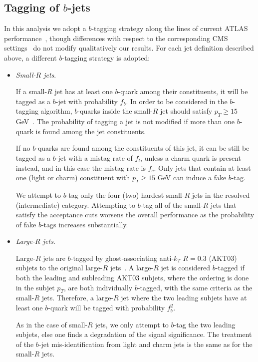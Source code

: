 \subsection{Tagging of $b$-jets}
\label{sec:btagging}

In this analysis we adopt
a $b$-tagging strategy along the lines
of current ATLAS performance~\cite{Aad:2013gja,Aad:2015ydr},
though differences with respect to
the corresponding CMS
settings~\cite{Khachatryan:2011wq,Chatrchyan:2012jua}
do not modify qualitatively our results.
%
For each jet definition described above, a different
$b$-tagging strategy is adopted:

\begin{itemize}

\item {\it Small-$R$ jets}.

  If a small-$R$ jet has at least one $b$-quark among their constituents,
  it will be tagged as a $b$-jet with probability $f_b$.
  In order to be considered in the $b$-tagging algorithm,
  $b$-quarks inside the small-$R$ jet
  should satisfy $p_T \ge 15$ GeV~\cite{Aad:2015ydr}.
  The probability of tagging a jet is not modified
  if more than one $b$-quark is found among the jet constituents.


  
  If no $b$-quarks are found among the constituents
  of this jet, it can be still be tagged as a $b$-jet with
  a mistag rate of $f_l$, unless a charm quark is present instead,
  and in this case the mistag rate is $f_c$.
  Only jets that contain at least one (light or charm)
  constituent
  with $p_T \ge 15$ GeV can induce a fake $b$-tag.

  
  We attempt to $b$-tag only the four (two) hardest small-$R$ jets
  in the resolved (intermediate) category.
  Attempting to $b$-tag all of the
  small-$R$ jets that satisfy the acceptance cuts worsens the
  overall performance as the probability of fake $b$-tags increases
  substantially.

  \item {\it Large-$R$ jets}.

    Large-$R$ jets are $b$-tagged by
    ghost-associating anti-$k_T$ $R=0.3$ (AKT03)
    subjets to the original large-$R$
    jets~\cite{Cacciari:2007fd,Aad:2013gja,
      ATLAS-CONF-2014-004,Aad:2015uka}.
    A large-$R$ jet is considered $b$-tagged if both
    the leading and subleading AKT03 subjets, where the ordering
    is done in the subjet $p_T$, are both individually $b$-tagged,
    with the same criteria as the small-$R$ jets.
     Therefore, a large-$R$ jet where the two leading
    subjets have at least one $b$-quark will be tagged
    with probability $f_b^2$.
    
    As in the case
    of small-$R$ jets, we only attempt to $b$-tag the two leading subjets,
    else one finds a degradation of the
    signal significance.
    The treatment of the $b$-jet mis-identification
    from light and charm jets
    is the same as for the small-$R$ jets.
  
\end{itemize}


